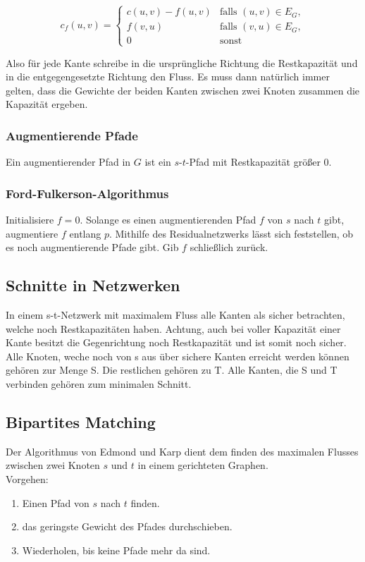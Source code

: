 \documentclass[11pt]{scrartcl}
\begin{document}
$$c_f(u,v) = \begin{cases}
	c(u,v) - f(u,v) & \text{falls } (u,v) \in E_G, \\
    f(v,u) & \text{falls } (v,u) \in E_G, \\
    0 & \text{sonst}
\end{cases}$$

Also für jede Kante schreibe in die ursprüngliche Richtung die Restkapazität und in die entgegengesetzte Richtung den Fluss. Es muss dann natürlich immer gelten, dass die Gewichte der beiden Kanten zwischen zwei Knoten zusammen die Kapazität ergeben.

\subsubsection{Augmentierende Pfade}
Ein augmentierender Pfad in $G$ ist ein $s$-$t$-Pfad mit Restkapazität größer 0.

\subsubsection{Ford-Fulkerson-Algorithmus}
Initialisiere $f=0$. Solange es einen augmentierenden Pfad $f$ von $s$ nach $t$ gibt, augmentiere $f$ entlang $p$. Mithilfe des Residualnetzwerks lässt sich feststellen, ob es noch augmentierende Pfade gibt. Gib $f$ schließlich zurück.

\subsection{Schnitte in Netzwerken}

In einem s-t-Netzwerk mit maximalem Fluss alle Kanten als sicher betrachten, welche noch Restkapazitäten haben. Achtung, auch bei voller Kapazität einer Kante besitzt die Gegenrichtung noch Restkapazität und ist somit noch sicher. Alle Knoten, weche noch von s aus über sichere Kanten erreicht werden können gehören zur Menge S. Die restlichen gehören zu T. Alle Kanten, die S und T verbinden gehören zum minimalen Schnitt.

\subsection{Bipartites Matching}
Der Algorithmus von Edmond und Karp dient dem finden des maximalen Flusses zwischen zwei Knoten $s$ und $t$ in einem gerichteten Graphen. \\
Vorgehen:
\begin{enumerate}
\item Einen Pfad von $s$ nach $t$ finden.
\item das geringste Gewicht des Pfades durchschieben.
\item Wiederholen, bis keine Pfade mehr da sind.
\end{enumerate}
\end{document}
